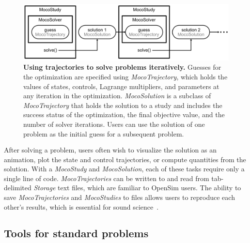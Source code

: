 \documentclass[10pt,letterpaper]{article}
\begin{document}
\begin{figure}[!h]
    \centering
    \includegraphics{../figures/MocoSolverDiagram.png}
    \caption{{\bf Using trajectories to solve problems iteratively.}
    Guesses for the optimization are specified using \textit{MocoTrajectory}, which holds the values of states, controls, Lagrange multipliers, and parameters at any iteration in the optimization. \textit{MocoSolution} is a subclass of \textit{MocoTrajectory} that holds the solution to a study and includes the success status of the optimization, the final objective value, and the number of solver iterations. Users can use the solution of one problem as the initial guess for a subsequent problem.
    }
    \label{mocosolverdiagram}
\end{figure}

After solving a problem, users often wish to visualize the solution as an animation, plot the state and control trajectories, or compute quantities from the solution. With a \textit{MocoStudy} and \textit{MocoSolution}, each of these tasks require only a single line of code. \textit{MocoTrajectories} can be written to and read from tab-delimited \textit{Storage} text files, which are familiar to OpenSim users. The ability to save \textit{MocoTrajectories} and \textit{MocoStudies} to files allows users to reproduce each other’s results, which is essential for sound science~\cite{Peng:2011}.

\subsection*{Tools for standard problems}
\end{document}
